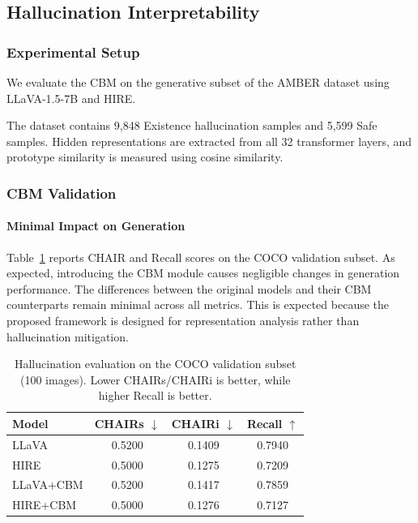 \subsection{Hallucination Interpretability}

\subsubsection{Experimental Setup}

We evaluate the CBM on the generative subset of the AMBER dataset using LLaVA-1.5-7B and HIRE.

The dataset\citep{wang2023amber} contains 9,848 Existence hallucination samples and 5,599 Safe samples. Hidden representations are extracted from all 32 transformer layers, and prototype similarity is measured using cosine similarity.



\subsubsection{CBM Validation}

\paragraph{Minimal Impact on Generation}
Table~\ref{tab:chair_results} reports CHAIR and Recall scores on the COCO validation subset. 
As expected, introducing the CBM module causes negligible changes in generation performance. The differences between the original models and their CBM counterparts remain minimal across all metrics. This is expected because the proposed framework is designed for representation analysis rather than hallucination mitigation.

\begin{table}[t]
\centering
\caption{Hallucination evaluation on the COCO validation subset (100 images). Lower CHAIRs/CHAIRi is better, while higher Recall is better.}
\begin{tabular}{lccc}
\hline
Model & CHAIRs $\downarrow$ & CHAIRi $\downarrow$ & Recall $\uparrow$ \\
\hline
LLaVA      & 0.5200 & 0.1409 & 0.7940 \\
HIRE       & 0.5000 & 0.1275 & 0.7209 \\
LLaVA+CBM  & 0.5200 & 0.1417 & 0.7859 \\
HIRE+CBM   & 0.5000 & 0.1276 & 0.7127 \\
\hline
\end{tabular}
\label{tab:chair_results}
\end{table}


